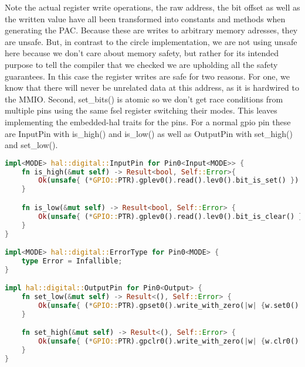 Note the actual register write operations, the raw address,
the bit offset as well as the written value have all been transformed into constants and methods when generating the PAC.
Because these are writes to arbitrary memory adresses, they are unsafe.
But, in contrast to the circle implementation, we are not using unsafe here because we don't care about memory safety,
but rather for its intended purpose to tell the compiler that we checked we are upholding all the safety guarantees.
In this case the register writes are safe for two reasons.
For one, we know that there will never be unrelated data at this address, as it is hardwired to the MMIO.
Second, set\_bits() is atomic so we don't get race conditions from multiple pins using the same fsel register switching their modes.
This leaves implementing the embedded-hal traits for the pins. For a normal gpio pin these are InputPin with is\_high() and is\_low() as well as OutputPin with set\_high() and set\_low().

\begin{lstlisting}[language=Rust,style=colouredRust]
impl<MODE> hal::digital::InputPin for Pin0<Input<MODE>> {
    fn is_high(&mut self) -> Result<bool, Self::Error>{
        Ok(unsafe{ (*GPIO::PTR).gplev0().read().lev0().bit_is_set() })
    }

    fn is_low(&mut self) -> Result<bool, Self::Error> {
        Ok(unsafe{ (*GPIO::PTR).gplev0().read().lev0().bit_is_clear() })
    }
}

impl<MODE> hal::digital::ErrorType for Pin0<MODE> {
    type Error = Infallible;
}

impl hal::digital::OutputPin for Pin0<Output> {
    fn set_low(&mut self) -> Result<(), Self::Error> {
        Ok(unsafe{ (*GPIO::PTR).gpset0().write_with_zero(|w| {w.set0().set_bit()}) })
    }

    fn set_high(&mut self) -> Result<(), Self::Error> {
        Ok(unsafe{ (*GPIO::PTR).gpclr0().write_with_zero(|w| {w.clr0().clear_bit_by_one()}) })
    }
}
\end{lstlisting}

